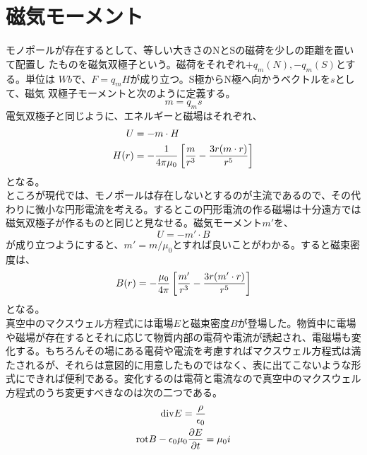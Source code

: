     \section{磁気モーメント}
        モノポールが存在するとして、等しい大きさのNとSの磁荷を少しの距離を置いて配置し
        たものを磁気双極子という。磁荷をそれぞれ$+q_m(N),-q_m(S)$とする。単位は
        $Wb$で、$F = q_m H$が成り立つ。S極からN極へ向かうベクトルを$s$として、磁気
        双極子モーメントと次のように定義する。
            \[m = q_m s\]
        電気双極子と同じように、エネルギーと磁場はそれぞれ、
        \begin{align*}
            U &= -m\cdot H\\
            H(r) &= -\rec{4\pi\mu_0}\llr{\frac{m}{r^3} - \frac{3r(m\cdot r)}{r^5}}
        \end{align*}
        となる。\\
        ところが現代では、モノポールは存在しないとするのが主流であるので、その代わりに微小な円形電流を考える。するとこの円形電流の作る磁場は十分遠方では磁気双極子が作るものと同じと見なせる。磁気モーメント$m'$を、
            \[U = -m'\cdot B\]
        が成り立つようにすると、$m'=m/\mu_0$とすれば良いことがわかる。すると磁束密度は、
            \[B(r) = -\frac{\mu_0}{4\pi}\llr{\frac{m'}{r^3}
            -\frac{3r(m'\cdot r)}{r^5}}\]
        となる。\\
    真空中のマクスウェル方程式には電場$E$と磁束密度$B$が登場した。物質中に電場や磁場が存在するとそれに応じて物質内部の電荷や電流が誘起され、電磁場も変化する。もちろんその場にある電荷や電流を考慮すればマクスウェル方程式は満たされるが、それらは意図的に用意したものではなく、表に出てこないような形式にできれば便利である。変化するのは電荷と電流なので真空中のマクスウェル方程式のうち変更すべきなのは次の二つである。
    \begin{gather*}
        \dive E = \frac{\rho}{\epsilon_0}\\
        \rot B - \epsilon_0\mu_0\pd[E]{t} = \mu_0 i
    \end{gather*}
